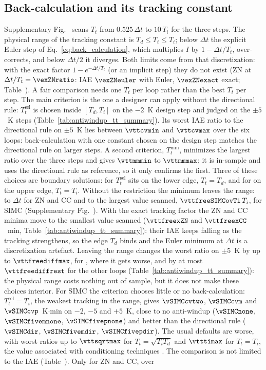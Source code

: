 \subsection{Back-calculation and its tracking constant}
\label{subsec:backcalc}
Supplementary Fig.~ scans $T_t$ from $0.525\,\Delta t$ to $10\,T_i$ for the three steps. The physical range of the tracking constant is $T_d \le T_t \le T_i$; below $\Delta t$ the explicit Euler step of Eq.~\eqref{eq:back_calculation}, which multiplies $I$ by $1 - \Delta t/T_t$, over-corrects, and below $\Delta t/2$ it diverges. Both limits come from that discretization: with the exact factor $1 - e^{-\Delta t/T_t}$ (or an implicit step) they do not exist (ZN at $\Delta t/T_t = \vexZNratio$: IAE $\vexZNeuler$ with Euler, $\vexZNexact$ exact; Table~). A fair comparison needs one $T_t$ per loop rather than the best $T_t$ per step. The main criterion is the one a designer can apply without the directional rule: $T_t^{\mathrm{sel}}$ is chosen inside $[T_d, T_i]$ on the $-2$~K design step and judged on the $\pm 5$~K steps (Table~\ref{tab:antiwindup_tt_summary}). Its worst IAE ratio to the directional rule on $\pm 5$~K lies between $\vttcvmin$ and $\vttcvmax$ over the six loops: back-calculation with one constant chosen on the design step matches the directional rule on larger steps. A second criterion, $T_t^{\mathrm{mm}}$, minimizes the largest ratio over the three steps and gives $\vttmmmin$ to $\vttmmmax$; it is in-sample and uses the directional rule as reference, so it only confirms the first. Three of these choices are boundary solutions: for \vttcvlower{} $T_t^{\mathrm{sel}}$ sits on the lower edge, $T_t = T_d$, and for \vttcvupper{} on the upper edge, $T_t = T_i$. Without the restriction the minimum leaves the range: to $\Delta t$ for ZN and CC and to the largest value scanned, $\vttfreeSIMCovTi\,T_i$, for SIMC (Supplementary Fig.~). With the exact tracking factor the ZN and CC minima move to the smallest value scanned ($\vttfreexZN$ and $\vttfreexCC$~min, Table~\ref{tab:antiwindup_tt_summary}): their IAE keeps falling as the tracking strengthens, so the edge $T_d$ binds and the Euler minimum at $\Delta t$ is a discretization artefact. Leaving the range changes the worst ratio on $\pm 5$~K by up to $\vttfreediffmax$, for \vttfreediffloop{}, where it gets worse, and by at most $\vttfreediffrest$ for the other loops (Table~\ref{tab:antiwindup_tt_summary}): the physical range costs nothing out of sample, but it does not make these choices interior. For SIMC the criterion chooses little or no back-calculation: $T_t^{\mathrm{sel}} = T_i$, the weakest tracking in the range, gives $\vSIMCcvtwo$, $\vSIMCcvm$ and $\vSIMCcvp$~K$\cdot$min on $-2$, $-5$ and $+5$~K, close to no anti-windup ($\vSIMCnone$, $\vSIMCfivemnone$, $\vSIMCfivepnone$) and better than the directional rule ($\vSIMCdir$, $\vSIMCfivemdir$, $\vSIMCfivepdir$). The usual defaults are worse, with worst ratios up to $\vttsqrtmax$ for $T_t = \sqrt{T_iT_d}$ and $\vtttimax$ for $T_t = T_i$, the value associated with conditioning techniques \cite{peng1996nonlinear}. The comparison is not limited to the IAE (Table~). Only for ZN and CC, over 